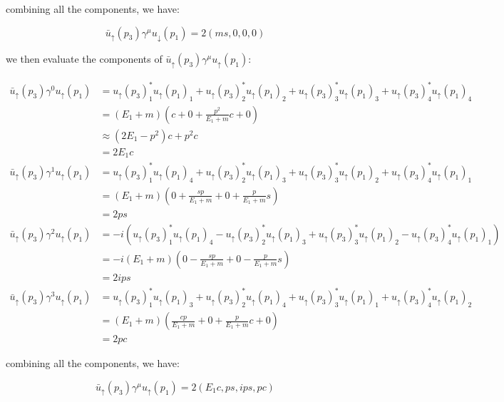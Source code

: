 \documentclass[11pt]{article}
\theoremstyle{definition}
\begin{document}
combining all the components, we have:

\begin{equation}
\boxed{
    \bar{u}_{\uparrow}(p_3)\gamma^{\mu}u_{\downarrow}(p_1) = 
    2(ms, 0, 0, 0)
}
\end{equation}

we then evaluate the components of $\bar{u}_{\uparrow}(p_3)\gamma^{\mu}u_{\uparrow}(p_1)$:

\begin{align}
    \bar{u}_{\uparrow}(p_3)\gamma^{0}u_{\uparrow}(p_1)
    &=
    u_{\uparrow}(p_3)_1^*u_{\uparrow}(p_1)_1 + u_{\uparrow}(p_3)_2^*u_{\uparrow}(p_1)_2 + u_{\uparrow}(p_3)_3^*u_{\uparrow}(p_1)_3 + u_{\uparrow}(p_3)_4^*u_{\uparrow}(p_1)_4\\
    &= (E_1+m)\left( c + 0 + \frac{p^2}{E_1+m}c + 0 \right)\\
    &\approx (2E_1-p^2)c + p^2c\\
    &= 2E_1c\\
    \bar{u}_{\uparrow}(p_3)\gamma^{1}u_{\uparrow}(p_1)
    &=
    u_{\uparrow}(p_3)_1^*u_{\uparrow}(p_1)_4 + u_{\uparrow}(p_3)_2^*u_{\uparrow}(p_1)_3 + u_{\uparrow}(p_3)_3^*u_{\uparrow}(p_1)_2 + u_{\uparrow}(p_3)_4^*u_{\uparrow}(p_1)_1\\
    &= (E_1+m) \left( 0 + \frac{sp}{E_1+m} + 0 + \frac{p}{E_1+m}s \right)\\
    &= 2ps\\
    \bar{u}_{\uparrow}(p_3)\gamma^{2}u_{\uparrow}(p_1)
    &=
    -i(u_{\uparrow}(p_3)_1^*u_{\uparrow}(p_1)_4 - u_{\uparrow}(p_3)_2^*u_{\uparrow}(p_1)_3 + u_{\uparrow}(p_3)_3^*u_{\uparrow}(p_1)_2 - u_{\uparrow}(p_3)_4^*u_{\uparrow}(p_1)_1)\\
    &= -i(E_1+m)\left(  0 - \frac{sp}{E_1+m} + 0 - \frac{p}{E_1+m}s  \right)\\
    &= 2ips\\
    \bar{u}_{\uparrow}(p_3)\gamma^{3}u_{\uparrow}(p_1)
    &=
    u_{\uparrow}(p_3)_1^*u_{\uparrow}(p_1)_3 + u_{\uparrow}(p_3)_2^*u_{\uparrow}(p_1)_4 + u_{\uparrow}(p_3)_3^*u_{\uparrow}(p_1)_1 + u_{\uparrow}(p_3)_4^*u_{\uparrow}(p_1)_2\\
    &=(E_1+m) \left( \frac{cp}{E_1+m} + 0 + \frac{p}{E_1+m}c + 0 \right)\\
    &= 2pc
\end{align}

combining all the components, we have:

\begin{equation}
\boxed{
    \bar{u}_{\uparrow}(p_3)\gamma^{\mu}u_{\uparrow}(p_1) = 
    2(E_1c, ps, ips, pc)
}
\end{equation}
\end{document}
